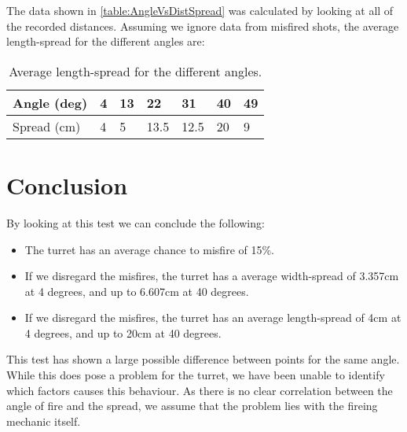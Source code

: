 The data shown in \autoref{table:AngleVsDistSpread} was calculated by looking at
all of the recorded distances. Assuming we ignore data from misfired shots, the
average length-spread for the different angles are:

\begin{table}[H]
\centering
\caption{Average length-spread for the different angles.}
\begin{tabular}{|l|l|l|l|l|l|l|}
\hline
Angle (deg) & 4 & 13 & 22   & 31   & 40 & 49 \\ \hline
Spread (cm) & 4 & 5  & 13.5 & 12.5 & 20 & 9  \\ \hline
\end{tabular}
\end{table}


\section{Conclusion}
By looking at this test we can conclude the following:
\begin{itemize}
  \item The turret has an average chance to misfire of 15\%.
  \item If we disregard the misfires, the turret has a average width-spread of
  3.357cm at 4 degrees, and up to 6.607cm at 40 degrees.
  \item If we disregard the misfires, the turret has an average length-spread of
  4cm at 4 degrees, and up to 20cm at 40 degrees.
  
\end{itemize}

This test has shown a large possible difference between points for the
same angle. While this does pose a problem for the turret, we have been unable
to identify which factors causes this behaviour. As there is no clear
correlation between the angle of fire and the spread, we assume that the problem
lies with the fireing mechanic itself. 
